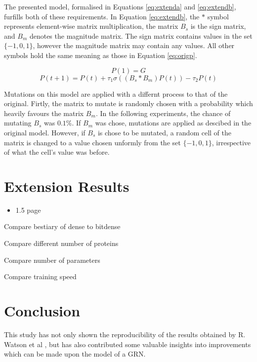 \documentclass[twocolumn,a4paper,11pt]{article}
\begin{document}
    The presented model, formalised in Equations \ref{eq:extenda} and \ref{eq:extendb}, furfills both of these requirements. In Equation \ref{eq:extendb}, the $*$ symbol represents element-wise matrix multiplication, the matrix $B_s$ is the sign matrix, and $B_m$ denotes the magnitude matrix. The sign matrix contains values in the set $\{-1,0,1\}$, however the magnitude matrix may contain any values. All other symbols hold the same meaning as those in Equation \ref{eq:origp}.

    \begin{equation} \label{eq:extenda}
        P(1) = G
    \end{equation}
    \begin{equation} \label{eq:extendb}
        P(t+1) = P(t) + \tau_1 \sigma ((B_s * B_m) P(t)) - \tau_2 P(t)
    \end{equation}

    Mutations on this model are applied with a differnt process to that of the original. Firtly, the matrix to mutate is randomly chosen with a probability which heavily favours the matrix $B_m$. In the following experiments, the chance of mutating $B_s$ was $0.1\%$. If $B_m$ was chose, mutations are applied as descibed in the original model. However, if $B_s$ is chose to be mutated, a random cell of the matrix is changed to a value chosen unformly from the set $\{-1,0,1\}$, irrespective of what the cell's value was before.

    \section{Extension Results}
    \begin{itemize}
        \item 1.5 page
    \end{itemize}

    Compare bestiary of dense to bitdense

    Compare different number of proteins

    Compare number of parameters

    Compare training speed


    \section{Conclusion}
    This study has not only shown the reproducibility of the results obtained by R. Watson et al \cite{rich}, but has also contributed some valuable insights into improvements which can be made upon the model of a GRN.
\end{document}
